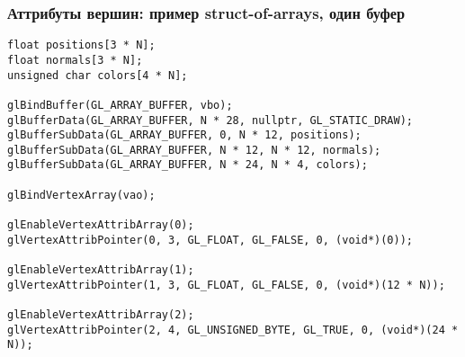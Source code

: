 \documentclass[10pt]{beamer}
\begin{document}
\begin{frame}[fragile]
\frametitle{Аттрибуты вершин: пример struct-of-arrays, один буфер}
\begin{verbatim}
float positions[3 * N];
float normals[3 * N];
unsigned char colors[4 * N];

glBindBuffer(GL_ARRAY_BUFFER, vbo);
glBufferData(GL_ARRAY_BUFFER, N * 28, nullptr, GL_STATIC_DRAW);
glBufferSubData(GL_ARRAY_BUFFER, 0, N * 12, positions);
glBufferSubData(GL_ARRAY_BUFFER, N * 12, N * 12, normals);
glBufferSubData(GL_ARRAY_BUFFER, N * 24, N * 4, colors);

glBindVertexArray(vao);

glEnableVertexAttribArray(0);
glVertexAttribPointer(0, 3, GL_FLOAT, GL_FALSE, 0, (void*)(0));

glEnableVertexAttribArray(1);
glVertexAttribPointer(1, 3, GL_FLOAT, GL_FALSE, 0, (void*)(12 * N));
    
glEnableVertexAttribArray(2);
glVertexAttribPointer(2, 4, GL_UNSIGNED_BYTE, GL_TRUE, 0, (void*)(24 * N));
\end{verbatim}
\begin{center}
\end{center}
\end{frame}
\end{document}
